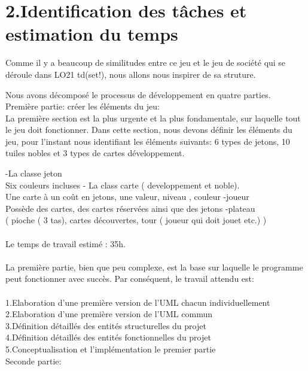 \documentclass[a4paper]{article}
\begin{document}
\section*{2.Identification des tâches et estimation du temps}
Comme il y a beaucoup de similitudes entre ce jeu et le jeu de société qui se déroule dans LO21 td(set!), nous allons nous inspirer de sa struture.

Nous avons décomposé le processus de développement en quatre parties.\\
Première partie: créer les éléments du jeu:\\
La première section est la plus urgente et la plus fondamentale, sur laquelle tout le jeu doit fonctionner. Dans cette section, nous devons définir les éléments du jeu, pour l'instant nous identifiant les éléments suivants: 6 types de jetons, 10 tuiles nobles et 3 types de cartes développement.

-La classe jeton\\
    Six couleurs incluses
- La class carte ( developpement et noble).\\
    Une carte à un coût en jetons, une valeur, niveau , couleur 
-joueur\\
Possède des cartes, des cartes réservées ainsi que des jetons
-plateau \\
( pioche ( 3 tas), cartes découvertes, tour ( joueur qui doit jouet etc.) )\\
\\
Le temps de travail estimé :  35h.\\
\\
La première partie, bien que peu complexe, est la base sur laquelle le programme peut fonctionner avec succès. Par conséquent, le travail attendu est:\\
\\
1.Elaboration d'une première version de l'UML chacun individuellement\\
2.Elaboration d'une première version de l'UML commun \\
3.Définition détaillés des entités structurelles du projet\\
4.Définition détaillés des entités fonctionnelles du projet\\
5.Conceptualisation et l’implémentation le premier partie\\




Seconde partie:\\
\end{document}
